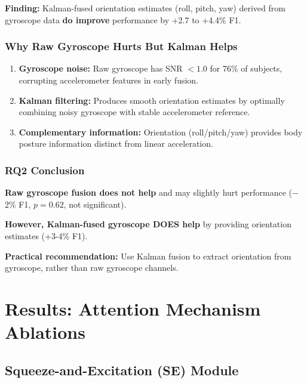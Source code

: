 \documentclass{article}
\begin{document}
\textbf{Finding:} Kalman-fused orientation estimates (roll, pitch, yaw) derived from gyroscope data \textbf{do improve} performance by +2.7 to +4.4\% F1.

\subsubsection{Why Raw Gyroscope Hurts But Kalman Helps}

\begin{enumerate}
    \item \textbf{Gyroscope noise:} Raw gyroscope has SNR $< 1.0$ for 76\% of subjects, corrupting accelerometer features in early fusion.
    \item \textbf{Kalman filtering:} Produces smooth orientation estimates by optimally combining noisy gyroscope with stable accelerometer reference.
    \item \textbf{Complementary information:} Orientation (roll/pitch/yaw) provides body posture information distinct from linear acceleration.
\end{enumerate}

\subsubsection{RQ2 Conclusion}

\begin{tcolorbox}[colback=green!5,colframe=green!50!black,title=\textbf{Answer to RQ2: Accelerometer-Only vs Accelerometer+Gyroscope}]
\textbf{Raw gyroscope fusion does not help} and may slightly hurt performance ($-$2\% F1, $p = 0.62$, not significant).

\textbf{However, Kalman-fused gyroscope DOES help} by providing orientation estimates (+3-4\% F1).

\textbf{Practical recommendation:} Use Kalman fusion to extract orientation from gyroscope, rather than raw gyroscope channels.
\end{tcolorbox}

\section{Results: Attention Mechanism Ablations}

\subsection{Squeeze-and-Excitation (SE) Module}
\end{document}
